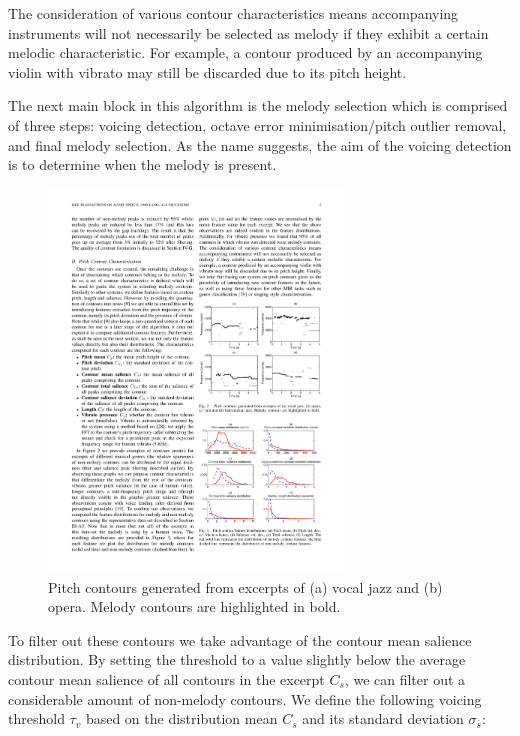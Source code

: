The consideration of various contour characteristics means accompanying instruments will not necessarily be selected as melody if they exhibit a certain melodic characteristic. For example, a contour produced by an accompanying violin with vibrato may still be discarded due to its pitch height. 

The next main block in this algorithm is the melody selection which is comprised of three steps: voicing detection, octave error minimisation/pitch outlier removal, and final melody selection.
As the name suggests, the aim of the voicing detection is to determine when the melody is present.

\begin{figure}[h!]
  \centering
    \includegraphics[width=0.7\textwidth]{Figures/pitchcontour}
      \caption{Pitch contours generated from excerpts of (a) vocal jazz and (b) opera. Melody contours are highlighted in bold.}

\end{figure}

To filter out these contours we take advantage of the contour mean salience distribution.
By setting the threshold to a value slightly below the average contour mean salience of all contours in the excerpt $C_{s}$, we can filter out a considerable amount of non-melody contours. We define the following voicing threshold $\tau_{v}$ based on the distribution mean $C_{s}$ and its standard deviation $\sigma_{\overline{s}}$:

